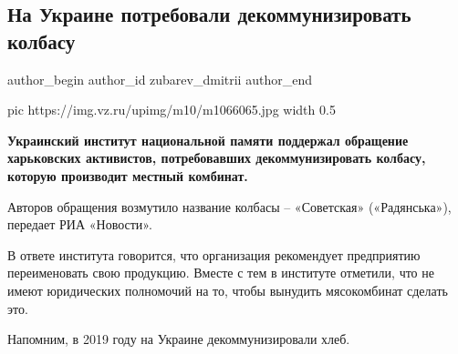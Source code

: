  
 
 
 
 
 
\subsection{На Украине потребовали декоммунизировать колбасу}
\label{sec:19_10_2020.news.ru.vz.zubarev_dmitrii.1.kolbasa_ukraina}
\ifcmt
	author_begin
   author_id zubarev_dmitrii
	author_end
\fi

\ifcmt
  pic https://img.vz.ru/upimg/m10/m1066065.jpg
  width 0.5
\fi

\textbf{Украинский институт национальной памяти поддержал обращение харьковских активистов, потребовавших декоммунизировать колбасу, которую производит местный комбинат.}

Авторов обращения возмутило название колбасы – «Советская» («Радянська»),
передает РИА «Новости».

В ответе института говорится, что организация рекомендует предприятию
переименовать свою продукцию. Вместе с тем в институте отметили, что не имеют
юридических полномочий на то, чтобы вынудить мясокомбинат сделать это. 

Напомним, в 2019 году на Украине декоммунизировали хлеб.

